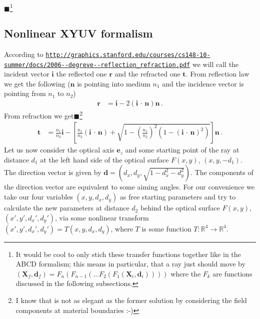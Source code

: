 \documentclass[12pt,a4paper,twoside,openright,BCOR10mm,headsepline,titlepage,abstracton,chapterprefix,final]{scrreprt}
\newcommand\Vector[1]{{\mathbf{#1}}}
\newcommand{\scpm}[2]{(#1\,\cdot\,#2)}
\newcommand{\remark}[1]{{\color{red}$\blacksquare$}\footnote{{\color{red}#1}}}
\begin{document}
\remark{It would be cool to only stich these transfer functions together like in the ABCD formalism;
this means in particular, that a ray just should move by $(\Vector{X}_f, \Vector{d}_f) = F_n (F_{n-1}( \dots F_2 (F_1(\Vector{X}_i, \Vector{d}_i))))$ where
the $F_k$ are functions discussed in the following subsections.}

\subsection{Nonlinear XYUV formalism}
According to {{\tt \url{http://graphics.stanford.edu/courses/cs148-10-summer/docs/2006--degreve--reflection_refraction.pdf}}}
we will call the incident vector $\Vector{i}$ the reflected one $\Vector{r}$ and the refracted one $\Vector{t}$.
From reflection law we get the following ($\Vector{n}$ is pointing into medium $n_1$ and the incidence vector is pointing from $n_1$ to $n_2$)
\begin{align}
 \Vector{r} &= \Vector{i} - 2 \scpm{\Vector{i}}{\Vector{n}} \Vector{n}\,.\label{eq:reflection_vector}
\end{align}
From refraction we get\remark{I know that is not as elegant as the former 
solution by considering the field components at material boundaries :-)}
\begin{align}
 \Vector{t} &= \frac{n_1}{n_2} \Vector{i} 
 - \left[\frac{n_1}{n_2} \scpm{\Vector{i}}{\Vector{n}} 
      + \sqrt{1 - \left(\frac{n_1}{n_2}\right)^2 (1 - {\scpm{\Vector{i}}{\Vector{n}}}^2)}\right] \Vector{n}\,.\label{eq:refraction_vector}
\end{align}
Let us now consider the optical axis $\Vector{e}_z$ and some starting point of the ray at distance $d_1$ at the left hand side
of the optical surface $F(x, y)$, $(x,y,-d_1)$. The direction vector is given by $\Vector{d} = (d_x, d_y, \sqrt{1 - d_x^2 - d_y^2})$.
The components of the direction vector are equivalent to some aiming angles. For our convenience we take our
four variables $(x, y, d_x, d_y)$ as free starting parameters and try to calculate the new parameters at distance $d_2$ behind the
optical surface $F(x, y)$, $(x', y', {d_x}', {d_y}')$, via some nonlinear transform $(x', y', {d_x}', {d_y}') = T(x, y, d_x, d_y)$,
where $T$ is some function $T:\mathbb{R}^4 \to \mathbb{R}^4$.
\end{document}
